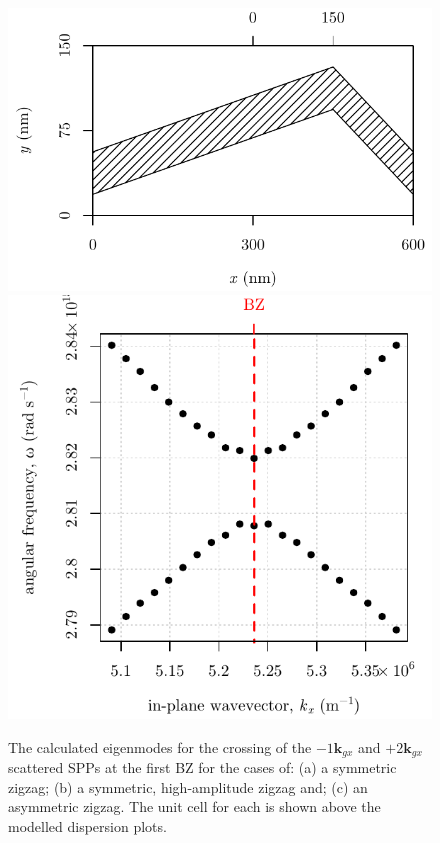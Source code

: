 \begin{figure}
\begin{center}
{\begin{minipage}{0.3\linewidth}
		\includegraphics[width=\textwidth]{./hfss-bandgaps/figure-asymmetric-unitcell}\\
		\includegraphics[width=\textwidth]{./hfss-bandgaps/figure-asymmetric-bandgaps}
	\end{minipage}
}
\end{center}
\caption[The calculated eigenmodes for the crossing of the $-1\mathbf{k}_{gx}$ and $+2\mathbf{k}_{gx}$ scattered SPPs at the first BZ for the cases of: a symmetric zigzag; a symmetric, high-amplitude zigzag and; an asymmetric zigzag.]{The calculated eigenmodes for the crossing of the $-1\mathbf{k}_{gx}$ and $+2\mathbf{k}_{gx}$ scattered SPPs at the first BZ for the cases of: (a) a symmetric zigzag; (b) a symmetric, high-amplitude zigzag and; (c) an asymmetric zigzag. The unit cell for each  is shown above the modelled dispersion plots.\label{fig:asy-bandgap-fem-unitcells}}
\end{figure}

